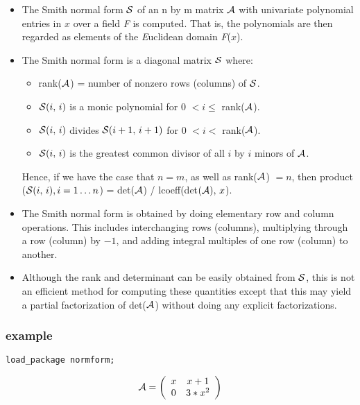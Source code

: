 \begin{itemize}
\item The Smith normal form ${\cal S}$ of an n by m matrix ${\cal A}$ 
with univariate polynomial entries in $x$ over a field {\it F} is 
computed. That is, the polynomials are then regarded as elements of the
{\it E}uclidean domain {\it F}($x$).

\item The Smith normal form is a diagonal matrix ${\cal S}$ where:

  \begin{itemize}
  \item rank(${\cal A}$) = number of nonzero rows (columns) of 
        ${\cal S}$.
  \item ${\cal S}(i,\, i)$ is a monic polynomial for 0 $< i \leq $
        rank(${\cal A}$).
  \item ${\cal S}(i,\, i)$ divides ${\cal S}(i+1,\, i+1)$ for 0 $< i
        <$ rank(${\cal A}$).
  \item ${\cal S}(i,\,i)$ is the greatest common divisor of all $i$ by 
        $i$ minors of ${\cal A}$.
  \end{itemize}

      Hence, if we have the case that $n = m$, as well as 
      rank(${\cal A}$) $= n$, then product (${\cal S}(i,\,i), 
      i=1\ldots n$) = det(${\cal A}$) / lcoeff(det$({\cal A}), \, x$).

\item The Smith normal form is obtained by doing elementary row and 
      column operations. This includes interchanging rows (columns),
      multiplying through a row (column) by $-1$, and adding integral 
      multiples of one row (column) to another.

\item Although the rank and determinant can be easily obtained from 
      ${\cal S}$, this is not an efficient method for computing these 
      quantities except that this may yield a partial factorization of 
      det(${\cal A}$) without doing any explicit factorizations.

\end{itemize}

\subsubsection{example}

{\tt load\_package normform;}

\begin{displaymath}
{\cal A} = \left( \begin{array}{cc} x & x+1 \\ 0 & 3*x^2 \end{array} 
\right)
\end{displaymath}

